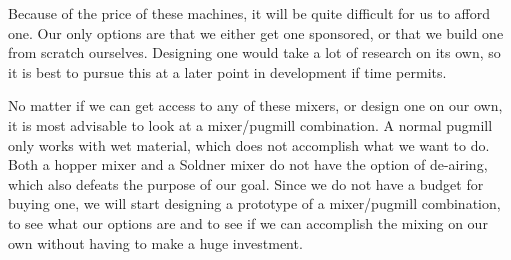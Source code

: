 \documentclass[12pt, a4paper]{article}
\begin{document}
Because of the price of these machines, it will be quite difficult for us to afford one. Our only options are that we either get one sponsored, or that we build one from scratch ourselves. Designing one would take a lot of research on its own, so it is best to pursue this at a later point in development if time permits.

No matter if we can get access to any of these mixers, or design one on our own, it is most advisable to look at a mixer/pugmill combination. A normal pugmill only works with wet material, which does not accomplish what we want to do. Both a hopper mixer and a Soldner mixer do not have the option of de-airing, which also defeats the purpose of our goal. Since we do not have a budget for buying one, we will start designing a prototype of a mixer/pugmill combination, to see what our options are and to see if we can accomplish the mixing on our own without having to make a huge investment.
	\newpage

	\nocite{*}
	
	\newpage
\end{document}
